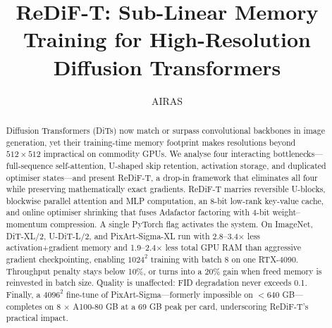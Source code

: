 \documentclass{article}
\title{ReDiF-T: Sub-Linear Memory Training for High-Resolution Diffusion Transformers}
\author{AIRAS}
\begin{document}
\maketitle

\begin{abstract}
Diffusion Transformers (DiTs) now match or surpass convolutional backbones in image generation, yet their training-time memory footprint makes resolutions beyond \(512\times512\) impractical on commodity GPUs. We analyse four interacting bottlenecks—full-sequence self-attention, U-shaped skip retention, activation storage, and duplicated optimiser states—and present ReDiF-T, a drop-in framework that eliminates all four while preserving mathematically exact gradients. ReDiF-T marries reversible U-blocks, blockwise parallel attention and MLP computation, an 8-bit low-rank key-value cache, and online optimiser shrinking that fuses Adafactor factoring with 4-bit weight–momentum compression. A single PyTorch flag activates the system. On ImageNet, DiT-XL/2, U-DiT-L/2, and PixArt-Sigma-XL run with 2.8–3.4\(\times\) less activation+gradient memory and 1.9–2.4\(\times\) less total GPU RAM than aggressive gradient checkpointing, enabling \(1024^2\) training with batch 8 on one RTX-4090. Throughput penalty stays below 10\%, or turns into a 20\% gain when freed memory is reinvested in batch size. Quality is unaffected: FID degradation never exceeds 0.1. Finally, a \(4096^2\) fine-tune of PixArt-Sigma—formerly impossible on \(<640\) GB—completes on 8 \(\times\) A100-80 GB at a 69 GB peak per card, underscoring ReDiF-T’s practical impact.
\end{abstract}
\end{document}
